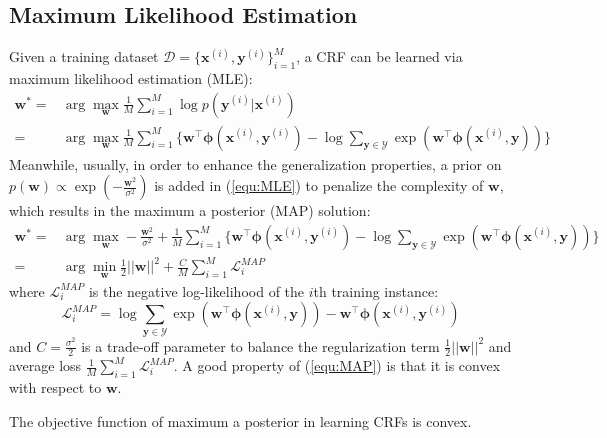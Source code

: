 \subsection{Maximum Likelihood Estimation}
\label{subsec:MLE}
Given a training dataset $\mathcal{D}=\{\mathbf{x}^{(i)},\mathbf{y}^{(i)}\}_{i=1}^M$, a CRF can be learned via maximum likelihood estimation (MLE):
\begin{equation}
    \begin{array}{rl}
        \mathbf{w}^* =& \arg\max_{\mathbf{w}} \frac{1}{M}\sum_{i=1}^M \log p(\mathbf{y}^{(i)}|\mathbf{x}^{(i)}) \\
                     =& \arg\max_{\mathbf{w}} \frac{1}{M}\sum_{i=1}^M \{\mathbf{w}^\top \boldsymbol{\phi}(\mathbf{x}^{(i)},\mathbf{y}^{(i)}) -\log \sum_{\mathbf{y}\in\mathcal{Y}} \exp(\mathbf{w}^\top \boldsymbol{\phi}(\mathbf{x}^{(i)},\mathbf{y}))\}
    \end{array}
    \label{equ:MLE}
\end{equation}
Meanwhile, usually, in order to enhance the generalization properties, a prior on $p(\mathbf{w})\propto \exp(-\frac{\mathbf{w}^2}{\sigma^2})$ is added in (\ref{equ:MLE}) to penalize the complexity of $\mathbf{w}$, which 
results in the maximum a posterior (MAP) solution:
\begin{equation}
    \begin{array}{rl}
        \mathbf{w}^* =& \arg\max_{\mathbf{w}}  -\frac{\mathbf{w}^2}{\sigma^2} +\frac{1}{M}\sum_{i=1}^M \{\mathbf{w}^\top \boldsymbol{\phi}(\mathbf{x}^{(i)},\mathbf{y}^{(i)}) -\log \sum_{\mathbf{y}\in\mathcal{Y}} \exp(\mathbf{w}^\top \boldsymbol{\phi}(\mathbf{x}^{(i)},\mathbf{y}))\}  \\ 
                     =& \arg\min_{\mathbf{w}} \frac{1}{2} ||\mathbf{w}||^2+  \frac{C}{M}\sum_{i=1}^M \mathcal{L}^{MAP}_i 
    \end{array}
    \label{equ:MAP}
\end{equation}
where $\mathcal{L}_i^{MAP}$ is the negative log-likelihood of the $i$th training instance:  
\begin{equation}
    \mathcal{L}^{MAP}_i=\log \sum_{\mathbf{y}\in\mathcal{Y}} \exp(\mathbf{w}^\top \boldsymbol{\phi}(\mathbf{x}^{(i)},\mathbf{y}))-\mathbf{w}^\top \boldsymbol{\phi}(\mathbf{x}^{(i)},\mathbf{y}^{(i)})
    \label{equ:MAP_loss}
\end{equation}
and $C=\frac{\sigma^2}{2}$ is a trade-off parameter to balance the regularization term $\frac{1}{2} ||\mathbf{w}||^2$ and average loss $\frac{1}{M}\sum_{i=1}^M \mathcal{L}^{MAP}_i$. A good property 
of (\ref{equ:MAP}) is that it is convex with respect to $\mathbf{w}$. 
\begin{proposition}
    The objective function of maximum a posterior in learning CRFs is convex.
\label{pro:MAP_convex}
\end{proposition}

